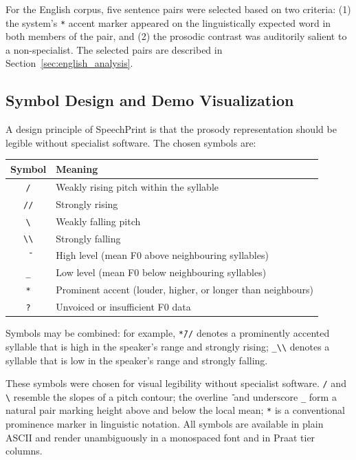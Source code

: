 For the English corpus, five sentence pairs were selected based on two
criteria: (1) the system's \texttt{*} accent marker appeared on the
linguistically expected word in both members of the pair, and (2) the prosodic
contrast was auditorily salient to a non-specialist. The selected pairs are
described in Section~\ref{sec:english_analysis}.

\subsection{Symbol Design and Demo Visualization}
\label{sec:demo_design}

A design principle of SpeechPrint is that the prosody representation should be
legible without specialist software. The chosen symbols are:

\begin{center}
\begin{tabular}{cl}
\hline
Symbol & Meaning \\
\hline
\texttt{/}  & Weakly rising pitch within the syllable \\
\texttt{//} & Strongly rising \\
\texttt{\textbackslash}  & Weakly falling pitch \\
\texttt{\textbackslash\textbackslash} & Strongly falling \\
\texttt{{\={}}} & High level (mean F0 above neighbouring syllables) \\
\texttt{\_} & Low level (mean F0 below neighbouring syllables) \\
\texttt{*}  & Prominent accent (louder, higher, or longer than neighbours) \\
\texttt{?}  & Unvoiced or insufficient F0 data \\
\hline
\end{tabular}
\end{center}

Symbols may be combined: for example, \texttt{*{\={}}//} denotes a prominently
accented syllable that is high in the speaker's range and strongly rising; \texttt{\_\textbackslash\textbackslash}
denotes a syllable that is low in the speaker's range and strongly falling.

These symbols were chosen for visual legibility without specialist software.
\texttt{/} and \texttt{\textbackslash} resemble the slopes of a pitch contour;
the overline \texttt{{\={}}} and underscore \texttt{\_} form a natural pair
marking height above and below the local mean; \texttt{*} is a conventional
prominence marker in linguistic notation. All symbols are available in plain
ASCII and render unambiguously in a monospaced font and in Praat tier columns.

